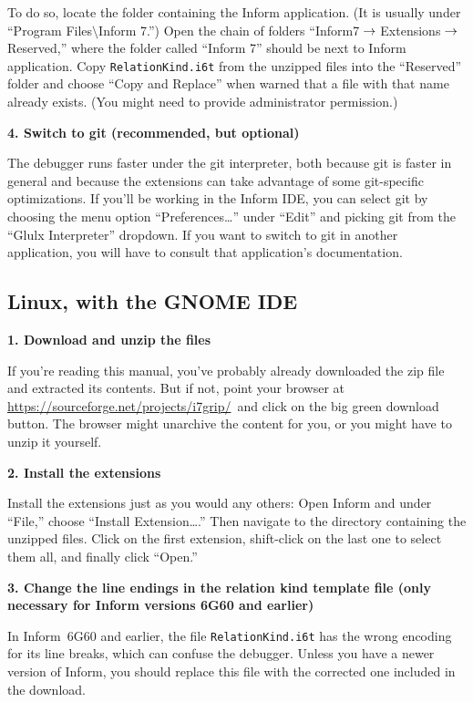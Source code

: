 \documentclass{book}
\newcommand{\lastpagebreak}{\vfill\pagebreak}
\newcommand{\downloadurl}{\url{https://sourceforge.net/projects/i7grip/}}
\newcommand{\downloadclick}{click on the big green download button}
\newcommand{\nil}{{\null}}
\newcommand{\thento}{\(\nil\rightarrow\nil\)}
\begin{document}
To do so, locate the folder containing the Inform application.  (It is
usually under ``Program Files\(\mathord{\setminus}\)Inform 7.'')  Open
the chain of folders ``Inform7\thento Extensions\thento Reserved,''
where the folder called ``Inform 7'' should be next to Inform
application.  Copy \texttt{RelationKind.i6t} from the unzipped files
into the ``Reserved'' folder and choose ``Copy and Replace'' when
warned that a file with that name already exists.  (You might need to
provide administrator permission.)

\textbf{4. Switch to git (recommended, but optional)}

The debugger runs faster under the git interpreter, both because git
is faster in general and because the extensions can take advantage of
some git-specific optimizations.  If you'll be working in the Inform
IDE, you can select git by choosing the menu option
``Preferences\dots'' under ``Edit'' and picking git from the ``Glulx
Interpreter'' dropdown.  If you want to switch to git in another
application, you will have to consult that application's
documentation.

\lastpagebreak

\subsection{Linux, with the GNOME IDE}

\textbf{1. Download and unzip the files}

If you're reading this manual, you've probably already downloaded the zip file
and extracted its contents.  But if not, point your browser at \downloadurl\ and
\downloadclick.  The browser might unarchive the content for you, or you might
have to unzip it yourself.

\textbf{2. Install the extensions}

Install the extensions just as you would any others: Open Inform and under
``File,'' choose ``Install Extension\dots.''  Then navigate to the directory
containing the unzipped files.  Click on the first extension, shift-click on the
last one to select them all, and finally click ``Open.''

\textbf{3. Change the line endings in the relation kind template file (only
  necessary for Inform versions 6G60 and earlier)}

In Inform~6G60 and earlier, the file \texttt{RelationKind.i6t} has the wrong
encoding for its line breaks, which can confuse the debugger.  Unless you have a
newer version of Inform, you should replace this file with the corrected one
included in the download.
\end{document}
